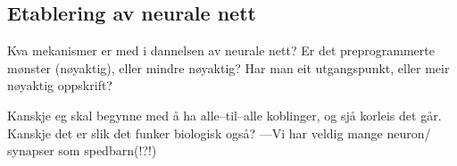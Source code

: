 \subsection{Etablering av neurale nett}
Kva mekanismer er med i dannelsen av neurale nett? Er det preprogrammerte mønster (nøyaktig), eller mindre nøyaktig? Har man eit utgangspunkt, eller meir nøyaktig oppskrift? 

Kanskje eg skal begynne med å ha alle--til--alle koblinger, og sjå korleis det går. Kanskje det er slik det funker biologisk også? ---Vi har veldig mange neuron/ synapser som spedbarn(!?!)



